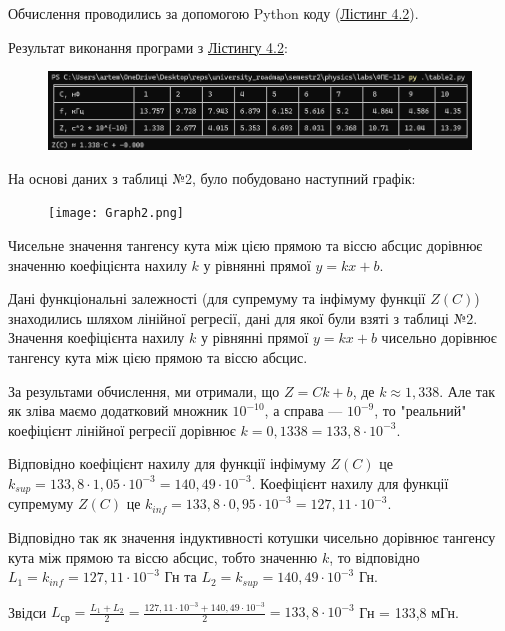 \documentclass[12pt,a4paper]{article}
\begin{document}
    Обчислення проводились за допомогою Python коду (\hyperlink{listing2}{Лістинг 4.2}).

    \newpage

    Результат виконання програми з \hyperlink{listing2}{Лістингу 4.2}:

    \begin{figure}[ht]
        \includegraphics[width=1.0\textwidth]{table2_photo.png}
    \end{figure}

    На основі даних з таблиці №2, було побудовано наступний графік:

    \begin{figure}[ht]
        \texttt{[image: Graph2.png]}
    \end{figure}

    \setlength{\parindent}{1.5em}

    Чисельне значення тангенсу кута між цією прямою та віссю абсцис дорівнює значенню коефіцієнта нахилу $k$ у рівнянні прямої $y = kx + b$.

    Дані функціональні залежності (для супремуму та інфімуму функції $Z(C)$) знаходились шляхом лінійної регресії, дані для якої були взяті з таблиці №2.
    Значення коефіцієнта нахилу $k$ у рівнянні прямої $y = kx + b$  чисельно дорівнює тангенсу кута між цією прямою та віссю абсцис.

    За результами обчислення, ми отримали, що $Z = Ck + b$, де $k \approx 1,338$. Але так як зліва маємо додатковий множник $10^{-10}$, а справа --- $10^{-9}$, то
    "реальний"  коефіцієнт лінійної регресії дорівнює $k = 0,1338 = 133,8 \cdot 10^{-3}$.

    Відповідно коефіцієнт нахилу для функції інфімуму $Z(C)$ це $k_{sup} = 133,8 \cdot 1,05 \cdot 10^{-3} = 140,49 \cdot 10^{-3}$.
    Коефіцієнт нахилу для функції супремуму $Z(C)$ це $k_{inf} = 133,8 \cdot 0,95 \cdot 10^{-3} = 127,11 \cdot 10^{-3}$.

    Відповідно так як значення індуктивності котушки чисельно дорівнює тангенсу кута між прямою та віссю абсцис, тобто значенню $k$, то відповідно
    $L_1 = k_{inf} = 127,11 \cdot 10^{-3}$ Гн та $L_2 = k_{sup} = 140,49 \cdot 10^{-3}$ Гн.

    Звідси $\displaystyle L_{\text{ср}} = \frac{L_1 + L_2}{2} = \frac{127,11 \cdot 10^{-3} + 140,49 \cdot 10^{-3}}{2} = 133,8 \cdot 10^{-3}$ Гн = 133,8 мГн.
\end{document}
